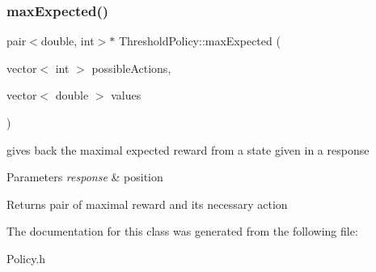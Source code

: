 \mbox{\label{class_threshold_policy_aa58828f3e4165f04fb9980766ce8af06}} 
\subsubsection{\texorpdfstring{max\+Expected()}{maxExpected()}}
{\footnotesize\ttfamily pair$<$double, int$>$$\ast$ Threshold\+Policy\+::max\+Expected (\begin{DoxyParamCaption}\item[{vector$<$ int $>$}]{possible\+Actions,  }\item[{vector$<$ double $>$}]{values }\end{DoxyParamCaption})\hspace{0.3cm}{\ttfamily [inline]}}

gives back the maximal expected reward from a state given in a response 
\begin{DoxyParams}{Parameters}
{\em response} & position \\
\hline
\end{DoxyParams}
\begin{DoxyReturn}{Returns}
pair of maximal reward and its necessary action 
\end{DoxyReturn}


The documentation for this class was generated from the following file\+:\begin{DoxyCompactItemize}
\item 
Policy.\+h\end{DoxyCompactItemize}
